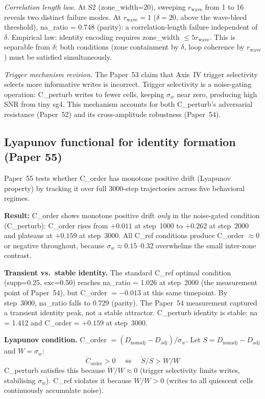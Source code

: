 \documentclass[11pt]{article}
\begin{document}
\textit{Correlation length law.}
At S2 (zone\_width=20), sweeping $r_\text{wave}$ from 1 to 16 reveals two
distinct failure modes.
At $r_\text{wave}=1$ ($\delta=20$, above the wave-bleed threshold),
na\_ratio = 0.748 (parity): a correlation-length failure independent of
$\delta$.
Empirical law: identity encoding requires
zone\_width $\leq 5 r_\text{wave}$.
This is separable from $\delta$: both conditions (zone containment by $\delta$,
loop coherence by $r_\text{wave}$) must be satisfied simultaneously.

\textit{Trigger mechanism revision.}
The Paper~53 claim that Axis~IV trigger selectivity selects more informative
writes is incorrect.
Trigger selectivity is a noise-gating operation: C\_perturb writes to fewer
cells, keeping $\sigma_w$ near zero, producing high SNR from tiny sg4.
This mechanism accounts for both C\_perturb's adversarial resistance
(Paper~52) and its cross-amplitude robustness (Paper~54).

\subsection{Lyapunov functional for identity formation (Paper 55)}

Paper~55 tests whether C\_order has monotone positive drift (Lyapunov property)
by tracking it over full 3000-step trajectories across five behavioral regimes.

\textbf{Result:}
C\_order shows monotone positive drift \emph{only} in the noise-gated condition
(C\_perturb): C\_order rises from $+0.011$ at step~1000 to $+0.262$ at step~2000
and plateaus at $+0.159$ at step~3000.
All C\_ref conditions produce C\_order $\approx 0$ or negative throughout,
because $\sigma_w \approx 0.15$--$0.32$ overwhelms the small inter-zone contrast.

\textbf{Transient vs.\ stable identity.}
The standard C\_ref optimal condition (supp=0.25, exc=0.50) reaches na\_ratio = 1.026
at step~2000 (the measurement point of Paper~54), but C\_order $= -0.013$ at
this same timepoint.
By step~3000, na\_ratio falls to 0.729 (parity).
The Paper~54 measurement captured a transient identity peak, not a stable attractor.
C\_perturb identity is stable: na = 1.412 and C\_order = $+0.159$ at step~3000.

\textbf{Lyapunov condition.}
C\_order $= (D_\mathrm{nonadj} - D_\mathrm{adj})/\sigma_w$.
Let $S = D_\mathrm{nonadj} - D_\mathrm{adj}$ and $W = \sigma_w$:
\begin{equation}
\dot{C}_\mathrm{order} > 0 \quad\Longleftrightarrow\quad \dot{S}/S > \dot{W}/W
\end{equation}
C\_perturb satisfies this because $\dot{W}/W \approx 0$ (trigger selectivity
limits writes, stabilising $\sigma_w$).
C\_ref violates it because $\dot{W}/W > 0$ (writes to all quiescent cells
continuously accumulate noise).
\end{document}
